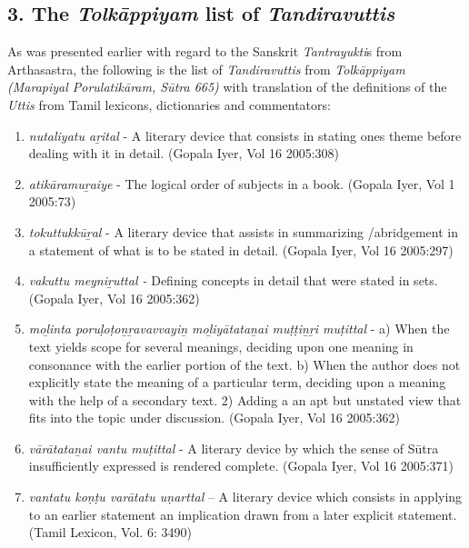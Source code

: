 \subsection*{3. The \textit{Tolkāppiyam} list of \textit{Tandiravuttis}}

As was presented earlier with regard to the Sanskrit \textit{Tantrayukti}s from Arthasastra, the following is the list of \textit{Tandiravuttis} from \textit{Tolkāppiyam (Marapiyal Porulatikāram, Sūtra 665)} with translation of the definitions of the \textit{Uttis} from Tamil lexicons, dictionaries and commentators:

\begin{enumerate}
\item \textit{nutaliyatu aṟital} - A literary device that consists in stating ones theme before dealing with it in detail. (Gopala Iyer, Vol 16 2005:308)

 \item \textit{atikāramuṟaiye} - The logical order of subjects in a book. (Gopala Iyer, Vol 1 2005:73)

 \item \textit{tokuttukkūṟal} - A literary device that assists in summarizing /abridgement in a statement of what is to be stated in detail. (Gopala Iyer, Vol 16 2005:297)

 \item \textit{vakuttu meyniṟuttal -} Defining concepts in detail that were stated in sets. (Gopala Iyer, Vol 16 2005:362)

 \item \textit{moḻinta poruḷoṭoṉṟavavvayiṉ moḻiyātataṉai muṭṭiṉṟi muṭittal} - a) When the text yields scope for several meanings, deciding upon one meaning in consonance with the earlier portion of the text. b) When the author does not explicitly state the meaning of a particular term, deciding upon a meaning with the help of a secondary text. 2) Adding a an apt but unstated view that fits into the topic under discussion. (Gopala Iyer, Vol 16 2005:362)

 \item \textit{vārātataṉai vantu muṭittal} - A literary device by which the sense of Sūtra insufficiently expressed is rendered complete. (Gopala Iyer, Vol 16 2005:371)

 \item \textit{vantatu koṇṭu varātatu uṇarttal} – A literary device which consists in applying to an earlier statement an implication drawn from a later explicit statement. (Tamil Lexicon, Vol. 6: 3490)


\end{enumerate}
